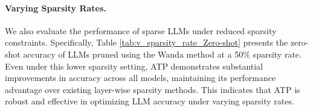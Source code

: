 \paragraph{Varying Sparsity Rates.}  
We also evaluate the performance of sparse LLMs under reduced sparsity constraints. Specifically, Table \ref{tab:v_sparsity_rate_Zero-shot} presents the zero-shot accuracy of LLMs pruned using the Wanda method at a 50$\%$ sparsity rate. Even under this lower sparsity setting, ATP demonstrates substantial improvements in accuracy across all models, maintaining its performance advantage over existing layer-wise sparsity methods. This indicates that ATP is robust and effective in optimizing LLM accuracy under varying sparsity rates.  
\begin{table}[h]
\centering
\renewcommand{\arraystretch}{1.1}
\caption{Average zero-shot accuracy of sparse LLaMA2-7B/13B models pruned using the Wanda method at 50$\%$ sparsity rate.}
\label{tab:v_sparsity_rate_Zero-shot}
\end{table}

